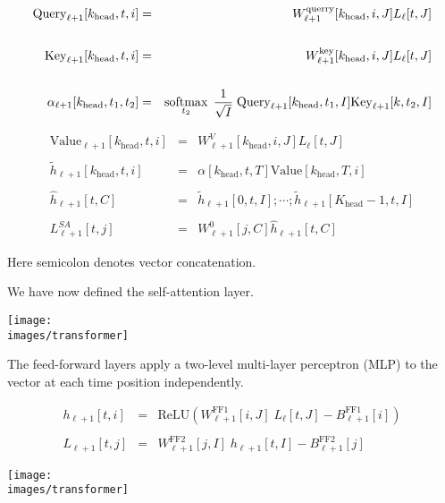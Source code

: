 {{\huge
\begin{eqnarray*}
\mathrm{Query}_{\ell+1}[k_\mathrm{head},t,i] & = & W^\mathrm{querry}_{\ell+1}[k_\mathrm{head},i,J]L_\ell[t,J] \\
\\
\mathrm{Key}_{\ell+1}[k_\mathrm{head},t,i] & = &  W^\mathrm{key}_{\ell+1}[k_\mathrm{head},i,J]L_\ell[t,J] \\
\\
\alpha_{\ell+1}[k_\mathrm{head},t_1,t_2] & = & \operatorname*{softmax}_{t_2}\; \frac{1}{\sqrt{I}}\;\mathrm{Query}_{\ell+1}[k_\mathrm{head},t_1,I]\mathrm{Key}_{\ell+1}[k,t_2,I]
\end{eqnarray*}
}

      
\begin{eqnarray*}
\mathrm{Value}_{\ell+1}[k_\mathrm{head},t,i] & = & W^V_{\ell+1}[k_\mathrm{head},i,J]L_\ell[t,J] \\
\\
\tilde{h}_{\ell+1}[k_\mathrm{head},t,i] & = & \alpha[k_\mathrm{head},t,T]\mathrm{Value}[k_\mathrm{head},T,i] \\
\\
\hat{h}_{\ell+1}[t,C] & = & \tilde{h}_{\ell+1}[0,t,I];\cdots;\tilde{h}_{\ell+1}[K_\mathrm{head}-1,t,I] \\
\\
L^{SA}_{\ell+1}[t,j] & = & W^0_{\ell+1}[j,C]\hat{h}_{\ell+1}[t,C]
\end{eqnarray*}

\vfill
Here semicolon denotes vector concatenation.


We have now defined the self-attention layer.
\vfill
\centerline{\texttt{[image: \\images/transformer]}}


The feed-forward layers apply a two-level multi-layer perceptron (MLP) to the vector at each time position independently.

\vfill

\begin{eqnarray*}
h_{\ell+1}[t,i] & = & \mathrm{ReLU}(W^{\mathrm{FF1}}_{\ell+1}[i,J]\;L_\ell[t,J] - B^{\mathrm{FF1}}_{\ell+1}[i]) \\
\\
L_{\ell+1}[t,j] & = & W^{\mathrm{FF2}}_{\ell+1}[j,I]\;h_{\ell+1}[t,I] - B^\mathrm{FF2}_{\ell+1}[j]
\end{eqnarray*}


\centerline{\texttt{[image: \\images/transformer]}}

}

